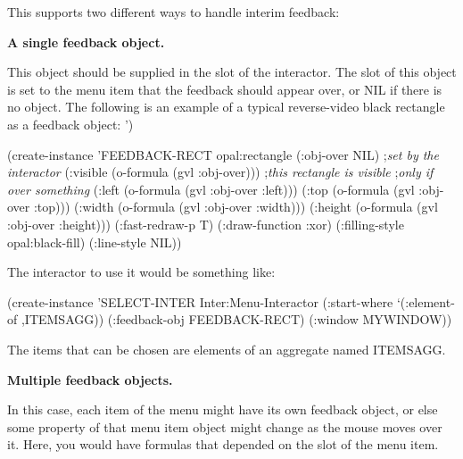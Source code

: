 This supports two different ways to handle interim feedback:

{\bf A single feedback object.}

This object should be supplied in the
 slot of the interactor.  The  slot of this
object is set to the menu item that the feedback should appear over, or NIL
if there is no object.  The following is an example of a typical reverse-video black
rectangle as a feedback object:
')
\begin{programexample}
(create-instance 'FEEDBACK-RECT opal:rectangle
   (:obj-over NIL) ;{\it set by the interactor}
   (:visible (o-formula (gvl :obj-over))) ;{\it this rectangle is visible}
                                          ;{\it only if over something}
   (:left (o-formula (gvl :obj-over :left)))
   (:top (o-formula (gvl :obj-over :top)))
   (:width (o-formula (gvl :obj-over :width)))
   (:height (o-formula (gvl :obj-over :height)))
   (:fast-redraw-p T)
   (:draw-function :xor)
   (:filling-style opal:black-fill)
   (:line-style NIL))
\end{programexample}

The interactor to use it would be something like:
\begin{programexample}
(create-instance 'SELECT-INTER Inter:Menu-Interactor
   (:start-where `(:element-of ,ITEMSAGG))
   (:feedback-obj FEEDBACK-RECT)
   (:window MYWINDOW))
\end{programexample}
The items that can be chosen are elements of an aggregate named ITEMSAGG.

{\bf Multiple feedback objects.}

In this case, each item of the menu might have its own feedback object, or
else some property of that menu item object might change as the mouse moves
over it.  Here, you would have formulas that depended on the
 slot of the menu item.


